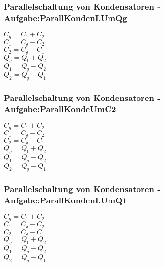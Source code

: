 \subsubsection{Parallelschaltung von Kondensatoren - Aufgabe:ParallKondenLUmQg} 
\begin{minipage}{0.45\textwidth} 
$ C_{g}  = C_{1}  + C_{2} $\\ 
$ C_{1}  = C_{g}  - C_{2} $\\ 
$ C_{2}  = C_{g}  - C_{1} $\\ 
$ Q_{g}  = Q_{1}  + Q_{2} $\\ 
$ Q_{1}  = Q_{g}  - Q_{2} $\\ 
$ Q_{2}  = Q_{g}  - Q_{1} $\\ 
\end{minipage} 
\begin{minipage}{0.45\textwidth} 
 
\end{minipage} 
\subsubsection{Parallelschaltung von Kondensatoren - Aufgabe:ParallKondeUmC2} 
\begin{minipage}{0.45\textwidth} 
$ C_{g}  = C_{1}  + C_{2} $\\ 
$ C_{1}  = C_{g}  - C_{2} $\\ 
$ C_{2}  = C_{g}  - C_{1} $\\ 
$ Q_{g}  = Q_{1}  + Q_{2} $\\ 
$ Q_{1}  = Q_{g}  - Q_{2} $\\ 
$ Q_{2}  = Q_{g}  - Q_{1} $\\ 
\end{minipage} 
\begin{minipage}{0.45\textwidth} 
 
\end{minipage} 
\subsubsection{Parallelschaltung von Kondensatoren - Aufgabe:ParallKondenLUmQ1} 
\begin{minipage}{0.45\textwidth} 
$ C_{g}  = C_{1}  + C_{2} $\\ 
$ C_{1}  = C_{g}  - C_{2} $\\ 
$ C_{2}  = C_{g}  - C_{1} $\\ 
$ Q_{g}  = Q_{1}  + Q_{2} $\\ 
$ Q_{1}  = Q_{g}  - Q_{2} $\\ 
$ Q_{2}  = Q_{g}  - Q_{1} $\\ 
\end{minipage} 
\begin{minipage}{0.45\textwidth} 
 
\end{minipage} 
